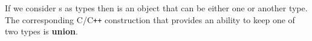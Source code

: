 \begin{example}
  \label{ex:cpp_sum}
  If we consider s as types then
   is an object that can be either one or another
  type. The corresponding C/C\texttt{++} construction that provides an ability
  to keep one of two types is \textbf{union}. 

    
          


\end{example}
